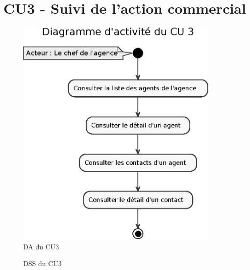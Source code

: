 \section{CU3 - Suivi de l’action commercial}

\begin{figure}[H]
\centering
\includegraphics[width=10cm]{figures/eps/DA_CU3.eps}
\caption{DA du CU3}
\end{figure}

\begin{figure}[H]
\noindent{}
\caption{DSS du CU3}
\end{figure}


